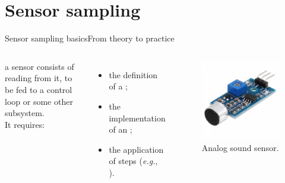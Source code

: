 
\section{Sensor sampling}
\graphicspath{{figs/section1/}}

\begin{frame}{Sensor sampling basics}{From theory to practice}
	\begin{columns}
		 a sensor consists of reading  from it, to be fed to a control loop or some other subsystem.\\
    It requires:
		\begin{itemize}
			\item the definition of a ;
			\item the implementation of an ;
			\item the application of  steps (\emph{e.g.}, ).
		\end{itemize}

		\begin{figure}
			\centering
			\includegraphics[width=.7\textwidth]{sensor.jpeg}
			\caption{Analog sound sensor.}
			\label{fig:sensor}
		\end{figure}
	\end{columns}
\end{frame}

